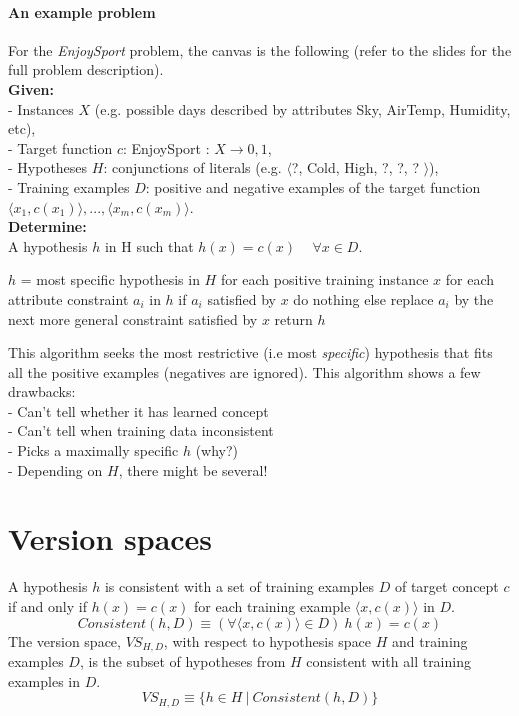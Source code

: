 \paragraph{An example problem} For the \textit{EnjoySport} problem, the canvas is the following (refer to the slides for the full problem description).\\
\textbf{Given:}\\
- Instances $X$ (e.g. possible days described by attributes Sky, AirTemp, Humidity, etc),\\
- Target function $c$: EnjoySport : $X \rightarrow {0, 1}$,\\
- Hypotheses $H$: conjunctions of literals (e.g. $\langle$?, Cold, High, ?, ?, ? $\rangle$),\\
- Training examples $D$: positive and negative examples of the target function $\langle x_1, c(x_1) \rangle, ..., \langle x_m, c(x_m) \rangle$.\\
\textbf{Determine:}\\
A hypothesis $h$ in H such that $h(x) = c(x)$ ~ $\forall x \in D$.


\begin{algorithm}[caption={Find-S.}, label={alg7}]
$h$ = most specific hypothesis in $H$
for each positive training instance $x$
    for each attribute constraint $a_i$ in $h$
        if $a_i$ satisfied by $x$
            do nothing
        else 
            replace $a_i$ by the next more  general constraint satisfied by $x$
return $h$
\end{algorithm}
This algorithm seeks the most restrictive (i.e most \textit{specific}) hypothesis that fits all the positive examples (negatives are ignored). This algorithm shows a few drawbacks:\\
- Can't tell whether it has learned concept\\
- Can't tell when training data inconsistent\\
- Picks a maximally specific $h$ (why?)\\
- Depending on $H$, there might be several!

\section{Version spaces} A hypothesis $h$ is consistent with a set of
training examples $D$ of target concept $c$ if and only if $h(x) = c(x)$ for each training example $\langle x, c(x) \rangle$ in $D$.
\begin{equation*}
    Consistent(h, D) \equiv (\forall \langle x, c(x) \rangle \in D) ~ h(x) = c(x) 
\end{equation*}
The version space, $VS_{H,D}$, with respect to hypothesis space $H$ and training examples $D$, is the subset of hypotheses from $H$ consistent with all training examples in $D$.
\begin{equation*}
    VS_{H, D} \equiv  \{ h \in H ~|~ Consistent(h, D) \}
\end{equation*}


